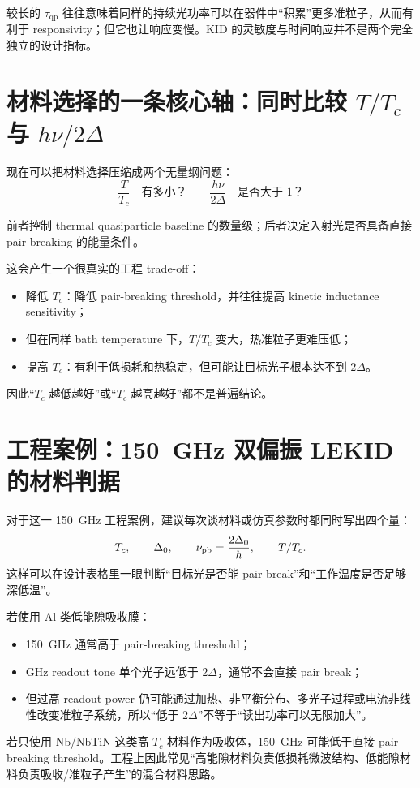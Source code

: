 \documentclass[11pt,a4paper,openany]{ctexrep}
\newcommand{\qp}{\mathrm{qp}}
\begin{document}
\begin{intuitionbox}
较长的 $\tau_{\qp}$ 往往意味着同样的持续光功率可以在器件中“积累”更多准粒子，从而有利于 responsivity；但它也让响应变慢。KID 的灵敏度与时间响应并不是两个完全独立的设计指标。
\end{intuitionbox}

\section{材料选择的一条核心轴：同时比较 $T/T_c$ 与 $h\nu/2\Delta$}

现在可以把材料选择压缩成两个无量纲问题：
\[
\boxed{
\frac{T}{T_c}\quad\text{有多小？}
}
\qquad
\boxed{
\frac{h\nu}{2\Delta}\quad\text{是否大于 1？}
}
\]

前者控制 thermal quasiparticle baseline 的数量级；后者决定入射光是否具备直接 pair breaking 的能量条件。

这会产生一个很真实的工程 trade-off：
\begin{itemize}
  \item 降低 $T_c$：降低 pair-breaking threshold，并往往提高 kinetic inductance sensitivity；
  \item 但在同样 bath temperature 下，$T/T_c$ 变大，热准粒子更难压低；
  \item 提高 $T_c$：有利于低损耗和热稳定，但可能让目标光子根本达不到 $2\Delta$。
\end{itemize}

因此“$T_c$ 越低越好”或“$T_c$ 越高越好”都不是普遍结论。

\section{工程案例：\SI{150}{GHz} 双偏振 LEKID 的材料判据}

\begin{projectbox}
对于这一 \SI{150}{GHz} 工程案例，建议每次谈材料或仿真参数时都同时写出四个量：
\[
T_c,\qquad
\Delta_0,\qquad
\nu_{\rm pb}=\frac{2\Delta_0}{h},\qquad
T/T_c.
\]
这样可以在设计表格里一眼判断“目标光是否能 pair break”和“工作温度是否足够深低温”。

若使用 Al 类低能隙吸收膜：
\begin{itemize}
  \item \SI{150}{GHz} 通常高于 pair-breaking threshold；
  \item GHz readout tone 单个光子远低于 $2\Delta$，通常不会直接 pair break；
  \item 但过高 readout power 仍可能通过加热、非平衡分布、多光子过程或电流非线性改变准粒子系统，所以“低于 $2\Delta$”不等于“读出功率可以无限加大”。
\end{itemize}

若只使用 Nb/NbTiN 这类高 $T_c$ 材料作为吸收体，\SI{150}{GHz} 可能低于直接 pair-breaking threshold。工程上因此常见“高能隙材料负责低损耗微波结构、低能隙材料负责吸收/准粒子产生”的混合材料思路。
\end{projectbox}
\end{document}
